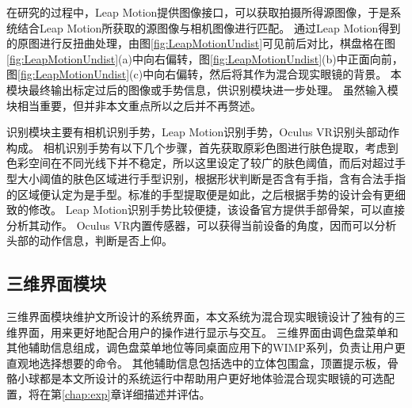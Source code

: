在研究的过程中，Leap Motion提供图像接口，可以获取拍摄所得源图像，于是系统结合Leap Motion所获取的源图像与相机图像进行匹配。
通过Leap Motion得到的原图进行反扭曲处理，由图\ref{fig:LeapMotionUndist}可见前后对比，棋盘格在图
\ref{fig:LeapMotionUndist}(a)中向右偏转，图\ref{fig:LeapMotionUndist}(b)中正面向前，图\ref{fig:LeapMotionUndist}(c)中向右偏转，然后将其作为混合现实眼镜的背景。
本模块最终输出标定过后的图像或手势信息，供识别模块进一步处理。
虽然输入模块相当重要，但并非本文重点所以之后并不再赘述。

\begin{figure}[!htpb]
  \centering
  \subfigure{\label{fig:LeapMotionUndist:left}}\addtocounter{subfigure}{-2}
	\subfigure{\label{fig:LeapMotionUndist:face}}\addtocounter{subfigure}{-2}
	\subfigure{\label{fig:LeapMotionUndist:right}}\addtocounter{subfigure}{-2}
\end{figure}

识别模块主要有相机识别手势，Leap Motion识别手势，Oculus VR识别头部动作构成。
相机识别手势有以下几个步骤，首先获取原彩色图进行肤色提取，考虑到色彩空间在不同光线下并不稳定，所以这里设定了较广的肤色阈值，而后对超过手型大小阈值的肤色区域进行手型识别，根据形状判断是否含有手指，含有合法手指的区域便认定为是手型。标准的手型提取便是如此，之后根据手势的设计会有更细致的修改。
Leap Motion识别手势比较便捷，该设备官方提供手部骨架，可以直接分析其动作。
Oculus VR内置传感器，可以获得当前设备的角度，因而可以分析头部的动作信息，判断是否上仰。

\subsection{三维界面模块}
\label{sec:interface}
三维界面模块维护文所设计的系统界面，本文系统为混合现实眼镜设计了独有的三维界面，用来更好地配合用户的操作进行显示与交互。
三维界面由调色盘菜单和其他辅助信息组成，调色盘菜单地位等同桌面应用下的WIMP系列，负责让用户更直观地选择想要的命令。
其他辅助信息包括选中的立体包围盒，顶置提示板，骨骼小球都是本文所设计的系统运行中帮助用户更好地体验混合现实眼镜的可选配置，将在第\ref{chap:exp}章详细描述并评估。

